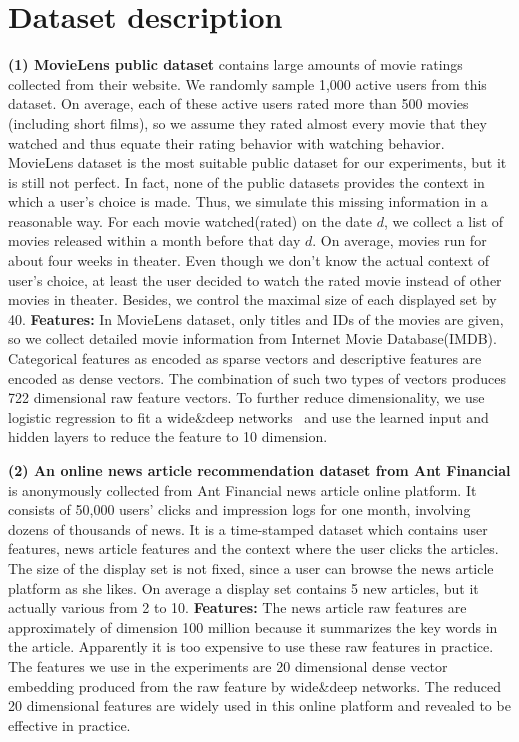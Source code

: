 \documentclass{article} %
\begin{document}
\section{Dataset description}\label{app:dataset}
{\bf (1) MovieLens public dataset} contains large amounts of movie ratings collected from their website. We randomly sample 1,000 active users from this dataset. On average, each of these active users rated more than 500 movies (including short films), so we assume they rated almost every movie that they watched and thus equate their rating behavior with watching behavior. MovieLens dataset is the most suitable public dataset for our experiments, but it is still not perfect. In fact, none of the public datasets provides the context in which a user's choice is made. Thus, we simulate this missing information in a reasonable way. For each movie watched(rated) on the date $d$, we collect a list of movies released within a month before that day $d$. On average, movies run for about four weeks in theater. Even though we don't know the actual context of user's choice, at least the user decided to watch the rated movie instead of other movies in theater. Besides, we control the maximal size of each displayed set by 40. {\bf Features:} In MovieLens dataset, only titles and IDs of the movies are given, so we collect detailed movie information from Internet Movie Database(IMDB). Categorical features as encoded as sparse vectors and descriptive features are encoded as dense vectors. The combination of such two types of vectors produces 722 dimensional raw feature vectors. To further reduce dimensionality, we use logistic regression to fit a wide\&deep networks~\citep{ChengKocHarmsen16} and use the learned input and hidden layers to reduce the feature to 10 dimension.

{\bf (2) An online news article recommendation dataset from Ant Financial} is anonymously collected from Ant Financial news article online platform. It consists of 50,000 users' clicks and impression logs for one month, involving dozens of thousands of news. It is a time-stamped dataset which contains user features, news article features and the context where the user clicks the articles. The size of the display set is not fixed, since a user can browse the news article platform as she likes. On average a display set contains 5 new articles, but it actually various from 2 to 10.  {\bf Features:} The news article raw features are approximately of dimension 100 million because it summarizes the key words in the article. Apparently it is too expensive to use these raw features in practice. The features we use in the experiments are 20 dimensional dense vector embedding produced from the raw feature by wide\&deep networks.
The reduced 20 dimensional features are widely used in this online platform and revealed to be effective in practice.
\end{document}
